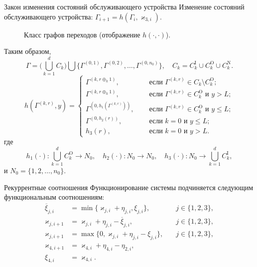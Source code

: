 \documentclass[10pt]{beamer}
\begin{document}
\begin{frame}[allowframebreaks]{Закон изменения состояний обслуживающего устройства}
 Изменение состояний обслуживающего устройства: $\Gamma_{i+1}=h(\Gamma_i,\varkappa_{3,i})$.
   \begin{figure}[h]
    \centering
    \caption{Класс графов переходов (отображение $h(\cdot,\cdot)$).}
    \label{VK:fig:3}
  \end{figure}
  \framebreak
  Таким образом, $$\Gamma = \bigl( \bigcup_{k=1}^d C_k \bigr) \bigcup \{\Gamma^{(0,1)}, \Gamma^{(0,2)}, \ldots, \Gamma^{(0,n_0)}\}, \quad C_k = C_k^{\mathrm{I}} \cup C_k^{\mathrm{O}}  \cup C_k^{\mathrm{N}}.$$
  \begin{equation*}
h(\Gamma^{(k,r)},y) = 
\begin{cases}
\Gamma^{(k,r\oplus_k 1)},& \quad \text{ если } \Gamma^{(k,r)}\in C_k\setminus C_k^{\mathrm{O}};\\
\Gamma^{(k,r\oplus_k 1)},& \quad \text{ если } \Gamma^{(k,r)}\in C_k^{\mathrm{O}} \text{ и } y>L;\\
\Gamma^{(0,h_1(\Gamma^{(k,r)}))},& \quad \text{ если } \Gamma^{(k,r)}\in C_k^{\mathrm{O}} \text{ и } y\leqslant L;\\
\Gamma^{(0,h_2(r))},& \quad \text{ если } k=0 \text{ и } y\leqslant L;\\
h_3(r),& \quad \text{ если } k=0 \text{ и } y > L.
\end{cases}
\end{equation*}
где 
$$h_1(\cdot)\colon \bigcup_{k=1}^d C_k^{\mathrm{O}}\to N_0, \quad h_2(\cdot)\colon N_0\to N_0, \quad h_3(\cdot)\colon N_0 \to\bigcup_{k=1}^d C_k^{\mathrm{I}},$$ и $N_0=\{1,2, \ldots, n_0\}$.
\end{frame}

\begin{frame}{Рекуррентные соотношения}
Функционирование системы подчиняется следующим функциональным соотношениям:
\begin{equation}
\begin{aligned}
\overline{\xi}_{j,i}&=\min\{\varkappa_{j,i}+\eta_{j,i},\xi_{j,i}\}, \quad & j\in \{1,2,3\},\\
\varkappa_{j,i+1}&=\varkappa_{j,i}+\eta_{j,i}-\overline{\xi}_{j,i}, \quad & j\in \{1,2,3\},\\
\varkappa_{j,i+1}&=\max\{{0,\varkappa_{j,i}+\eta_{j,i}-\xi_{j,i}}\}, \quad & j\in \{1,2,3\},\\
\varkappa_{4,i+1}&=\varkappa_{4,i}+\eta_{4,i}-\eta_{2,i}, \quad &\\
\xi_{4,i} & = \varkappa_{4,i}. &
\end{aligned}
\label{rekk}
\end{equation}
\end{frame}
\end{document}
